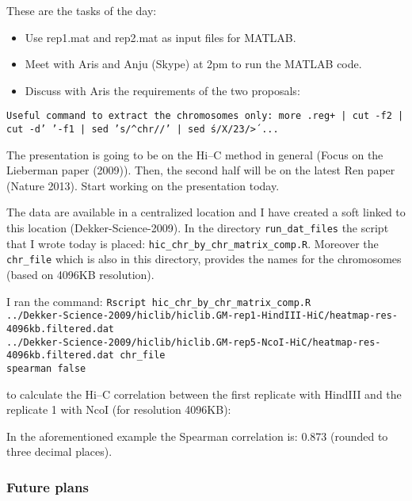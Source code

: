 \documentclass[idxtotoc,hyperref,openany]{labbook} %
\begin{document}
These are the tasks of the day:

\begin{itemize}
\item Use rep1.mat and rep2.mat as input files for MATLAB.
\item Meet with Aris and Anju (Skype) at 2pm to run the MATLAB code. 
\item Discuss with Aris the requirements of the two proposals:
\end{itemize}

\texttt{Useful command to extract the chromosomes only: more .reg+ | cut -f2 | cut -d' '-f1 | sed 's/^chr//' | sed \'s/X/23/\' > ...}

The presentation is going to be on the Hi--C method in general (Focus on
the Lieberman paper (2009)). Then, the second half will be on the latest 
Ren paper (Nature 2013). Start working on the presentation today.

The data are available in a centralized location and I have created a soft
linked to this location (Dekker-Science-2009). In the directory \texttt{run\_dat\_files}
the script that I wrote today is placed: \texttt{hic\_chr\_by\_chr\_matrix\_comp.R}.
Moreover the \texttt{chr\_file} which is also in this directory, provides the names
for the chromosomes (based on 4096KB resolution).

I ran the command:
{\texttt{Rscript hic\_chr\_by\_chr\_matrix\_comp.R \\
../Dekker-Science-2009/hiclib/hiclib.GM-rep1-HindIII-HiC/heatmap-res-4096kb.filtered.dat\\
../Dekker-Science-2009/hiclib/hiclib.GM-rep5-NcoI-HiC/heatmap-res-4096kb.filtered.dat chr_file\\spearman false}}

to calculate the Hi--C correlation between the first replicate
with HindIII and the replicate 1 with NcoI (for resolution 4096KB):

In the aforementioned example the Spearman correlation is: 0.873 (rounded
to three decimal places). 

\subsubsection*{Future plans}
\end{document}
